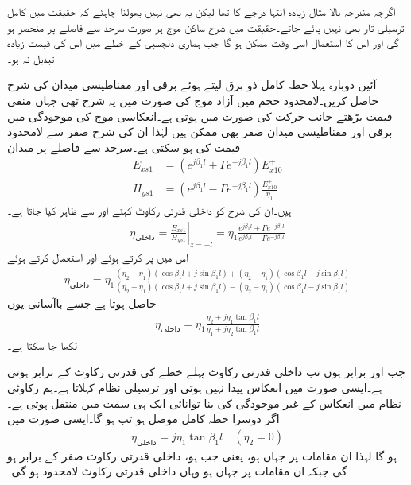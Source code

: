 اگرچہ مندرجہ بالا مثال زیادہ انتہا درجے کا تھا لیکن یہ بھی نہیں بھولنا چاہئے کہ حقیقت میں کامل ترسیلی تار بھی نہیں پائے جاتے۔حقیقت میں شرح ساکن موج ہر صورت سرحد سے فاصلے پر منحصر ہو گی اور اس کا استعمال اسی وقت ممکن ہو گا جب ہماری دلچسپی کے خطے میں اس کی قیمت زیادہ تبدیل نہ ہو۔   

آئیں دوبارہ پہلا خطہ کامل ذو برق لیتے ہوئے برقی اور مقناطیسی میدان کی شرح حاصل کریں۔لامحدود حجم میں آزاد موج کی صورت میں یہ شرح  تھی جہاں منفی قیمت بڑھتے  جانب حرکت کی صورت میں ہوتی ہے۔انعکاسی موج کی موجودگی میں برقی اور مقناطیسی میدان صفر بھی ممکن ہیں لہٰذا ان کی شرح صفر سے لامحدود قیمت کی ہو سکتی ہے۔سرحد سے  فاصلے پر میدان
 \begin{align*}
E_{xs1}&=\left(e^{j \beta_1 l}+ \Gamma e^{-j \beta_1 l} \right)E_{x10}^+ \\
H_{ys1}&=\left(e^{j \beta_1 l}- \Gamma e^{-j \beta_1 l} \right) \frac{E_{x10}^+}{\eta_1}
\end{align*}
ہیں۔ان کی شرح کو داخلی قدرتی رکاوٹ کہتے اور  سے ظاہر کیا جاتا ہے۔
\begin{align*}
\eta_{\text{داخلی}}=\left. \frac{E_{xs1}}{H_{ys1}} \right|_{z=-l}=\eta_1 \frac{e^{j \beta_1 l}+ \Gamma e^{-j \beta_1 l}}{e^{j \beta_1 l}- \Gamma e^{-j \beta_1 l}}
\end{align*}
اس میں  پر کرتے ہوئے اور   استعمال کرتے ہوئے
\begin{align*}
\eta_{\text{داخلی}}=\eta_1 \frac{(\eta_2+\eta_1)(\cos \beta_1 l +j \sin \beta_1 l)+(\eta_2-\eta_1)(\cos \beta_1 l -j \sin \beta_1 l)}{(\eta_2+\eta_1)(\cos \beta_1 l +j \sin \beta_1 l)-(\eta_2-\eta_1)(\cos \beta_1 l -j \sin \beta_1 l)}
\end{align*}
حاصل ہوتا ہے  جسے باآسانی یوں
\begin{align}\label{مساوات+موج_ترسیلی_نظام_داخلی_قدرتی_رکاوٹ_تعریف}
\eta_{\text{داخلی}}=\eta_1 \frac{\eta_2 +j \eta_1 \tan \beta_1 l}{\eta_1+j \eta_2 \tan \beta_1 l}
\end{align}
لکھا جا سکتا ہے۔

جب  اور  برابر ہوں تب داخلی قدرتی رکاوٹ  پہلے خطے کی قدرتی رکاوٹ  کے برابر ہوتی ہے۔ایسی صورت میں انعکاس پیدا نہیں ہوتی اور  ترسیلی نظام  کہلاتا ہے۔ہم رکاوٹی نظام میں انعکاس کے غیر موجودگی کی بنا توانائی ایک ہی سمت میں منتقل ہوتی ہے۔اگر دوسرا خطہ کامل موصل ہو تب  ہو گا۔ایسی صورت میں
\begin{align}
\eta_{\text{داخلی}}=j \eta_1 \tan \beta_1 l \quad (\eta_2=0)
\end{align}
ہو گا لہٰذا ان مقامات پر جہاں  ہو، یعنی جب  ہو، داخلی قدرتی رکاوٹ صفر کے برابر ہو گی جبکہ ان مقامات پر جہاں  ہو وہاں داخلی قدرتی رکاوٹ لامحدود ہو گی۔

